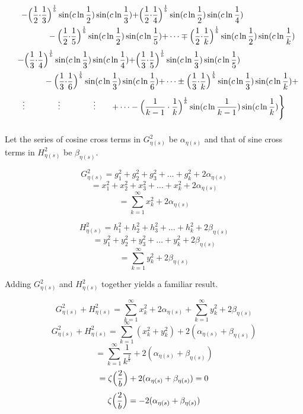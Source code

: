 \documentclass{amsart}
\begin{document}
	\[
	\begin{aligned}
		\quad - \Bigl( \frac{1}{2} {\cdot} \frac{1}{3}& \Bigr)^\frac1b \sin(c \ln \frac{1}{2}) \sin(c \ln \frac{1}{3}) {+} \Bigl( \frac{1}{2} {\cdot} \frac{1}{4} \Bigr)^\frac1b \sin(c \ln \frac{1}{2}) \sin(c \ln \frac{1}{4}) \\ 
		& - \Bigl( \frac{1}{2} {\cdot} \frac{1}{5} \Bigr)^\frac1b \sin(c \ln \frac{1}{2}) \sin(c \ln \frac{1}{5}) {+} \dots \mp \Bigl( \frac{1}{2} {\cdot} \frac{1}{k} \Bigr)^\frac1b \sin(c \ln \frac{1}{2}) \sin(c \ln \frac{1}{k}) \\
	\end{aligned}
	\]
	\[
	\begin{aligned}
		\quad - \Bigl( \frac{1}{3} {\cdot} \frac{1}{4}& \Bigr)^\frac1b \sin(c \ln \frac{1}{3}) \sin(c \ln \frac{1}{4}) {+} \Bigl( \frac{1}{3} {\cdot} \frac{1}{5} \Bigr)^\frac1b \sin(c \ln \frac{1}{3}) \sin(c \ln \frac{1}{5}) \\
		& - \Bigl( \frac{1}{3} {\cdot} \frac{1}{6} \Bigr)^\frac1b \sin(c \ln \frac{1}{3}) \sin(c \ln \frac{1}{6}) {+} \dots \pm \Bigl( \frac{1}{3} {\cdot} \frac{1}{k} \Bigr)^\frac1b \sin(c \ln \frac{1}{3}) \sin(c \ln \frac{1}{k}) {+} \\ 		
	\end{aligned}
	\]
	\[
	\begin{aligned}
		\vdots \qquad\qquad \vdots \qquad\qquad \vdots \qquad {+} \dots - \Bigl( \frac{1}{k-1} \cdot \frac{1}{k} \Bigr)^\frac1b \sin(c \ln \frac{1}{k-1}) \sin(c \ln \frac{1}{k}) \Biggr\}
	\end{aligned}
	\]
	\[\]
	
	Let the series of cosine cross terms in $G_{\eta(s)}^2$ be $\alpha_{\eta(s)}$ and that of sine cross terms in $H_{\eta(s)}^2$ be $\beta_{\eta(s)}$.
	
	\[ G_{\eta(s)}^2 = g_1^2 + g_2^2 + g_3^2 + \dots + g_k^2 + 2\alpha_{\eta(s)} \]
	\[ = x_1^2 + x_2^2 + x_3^2 + \dots + x_k^2 + 2\alpha_{\eta(s)} \]
	\[ = \sum\limits_{k=1}^{\infty}x_k^2 + 2\alpha_{\eta(s)} \]
	
	\[ H_{\eta(s)}^2 = h_1^2 + h_2^2 + h_3^2 + \dots + h_k^2 + 2\beta_{\eta(s)} \]
	\[ = y_1^2 + y_2^2 + y_3^2 + \dots + y_k^2 + 2\beta_{\eta(s)} \]
	\[ = \sum\limits_{k=1}^{\infty}y_k^2 + 2\beta_{\eta(s)} \]
	
	Adding $G_{\eta(s)}^2$ and $H_{\eta(s)}^2$ together yields a familiar result.
	
	\[ G_{\eta(s)}^2 + H_{\eta(s)}^2 = \sum\limits_{k=1}^{\infty}x_k^2 + 2\alpha_{\eta(s)} + \sum\limits_{k=1}^{\infty}y_k^2 + 2\beta_{\eta(s)} \]
	\[ G_{\eta(s)}^2 + H_{\eta(s)}^2 = \sum\limits_{k=1}^{\infty}(x_k^2 + y_k^2) + 2(\alpha_{\eta(s)} + \beta_{\eta(s)}) \]
	\[ = \sum\limits_{k=1}^{\infty}\frac{1}{k^{\frac{2}{b}}} + 2(\alpha_{\eta(s)} + \beta_{\eta(s)}) \]
	\[ = \zeta\Bigl( \frac{2}{b} \Bigr) + 2(\alpha_{\eta(s)} + \beta_{\eta(s)}) = 0 \]
	\[ \zeta\Bigl( \frac{2}{b} \Bigr) = - 2(\alpha_{\eta(s)} + \beta_{\eta(s)}) \]
	
\end{document}
